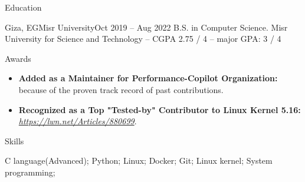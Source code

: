 \documentclass[]{Sohaib-Mohamed}
\begin{document}
\begin{cvsection}{Education}
   \begin{cvsubsection}{Giza, EG}{Misr University}{Oct 2019 -- Aug 2022}
      B.S. in Computer Science. Misr University for Science and Technology -- CGPA 2.75 / 4 -- major GPA: 3 / 4
   \end{cvsubsection}
\end{cvsection}


\begin{cvsection}{Awards}
   \begin{cvsubsection}{}{}{}
      \begin{itemize}
         \item \textbf{Added as a Maintainer for Performance-Copilot Organization:} because of the proven track record of past contributions.
         \item \textbf{Recognized as a Top "Tested-by" Contributor to Linux Kernel 5.16:} \href{https://lwn.net/Articles/880699/}{\textit{https://lwn.net/Articles/880699}}.
      \end{itemize}
   \end{cvsubsection}
\end{cvsection}


\begin{cvsection}{Skills}
   \begin{cvsubsection}{}{}{}
      C language(Advanced); Python; Linux; Docker; Git; Linux kernel; System programming;
   \end{cvsubsection}
\end{cvsection}
\end{document}
